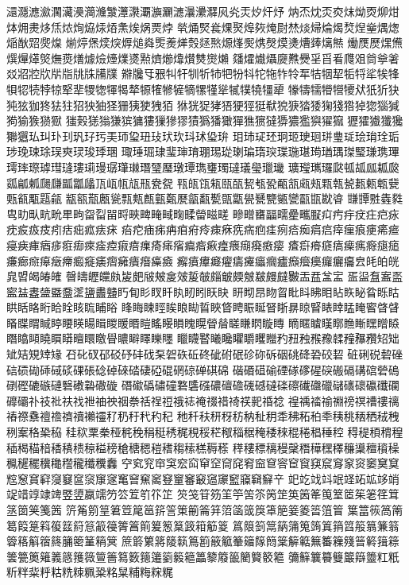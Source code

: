 㶎㶏㶐㶑㶒㶓㶔㶕㶖㶗㶘㶙㶚㶛㶜㶝㶞㶟㶠㶡㶢㶣㶤㶥㶦
㶧㶨㶩㶪㶫㶬㶭㶮㶯㶰㶱㶲㶳㶴㶵㶶㶷㶸㶹㶺㶻㶼㶽㶾㶿
㷀㷁㷂㷃㷄㷅㷆㷇㷈㷉㷊㷋㷌㷍㷎㷏㷐㷑㷒㷓㷔㷕㷖㷗㷘
㷙㷚㷛㷜㷝㷞㷟㷠㷡㷢㷣㷤㷥㷦㷧㷨㷩㷪㷫㷬㷭㷮㷯㷰㷱
㷲㷳㷴㷵㷶㷷㷸㷹㷺㷻㷼㷽㷾㷿㸀㸁㸂㸃㸄㸅㸆㸇㸈㸉㸊
㸋㸌㸍㸎㸏㸐㸑㸒㸓㸔㸕㸖㸗㸘㸙㸚㸛㸜㸝㸞㸟㸠㸡㸢㸣
㸤㸥㸦㸧㸨㸩㸪㸫㸬㸭㸮㸯㸰㸱㸲㸳㸴㸵㸶㸷㸸㸹㸺㸻㸼
㸽㸾㸿㹀㹁㹂㹃㹄㹅㹆㹇㹈㹉㹊㹋㹌㹍㹎㹏㹐㹑㹒㹓㹔㹕
㹖㹗㹘㹙㹚㹛㹜㹝㹞㹟㹠㹡㹢㹣㹤㹥㹦㹧㹨㹩㹪㹫㹬㹭㹮
㹯㹰㹱㹲㹳㹴㹵㹶㹷㹸㹹㹺㹻㹼㹽㹾㹿㺀㺁㺂㺃㺄㺅㺆㺇
㺈㺉㺊㺋㺌㺍㺎㺏㺐㺑㺒㺓㺔㺕㺖㺗㺘㺙㺚㺛㺜㺝㺞㺟㺠
㺡㺢㺣㺤㺥㺦㺧㺨㺩㺪㺫㺬㺭㺮㺯㺰㺱㺲㺳㺴㺵㺶㺷㺸㺹
㺺㺻㺼㺽㺾㺿㻀㻁㻂㻃㻄㻅㻆㻇㻈㻉㻊㻋㻌㻍㻎㻏㻐㻑㻒
㻓㻔㻕㻖㻗㻘㻙㻚㻛㻜㻝㻞㻟㻠㻡㻢㻣㻤㻥㻦㻧㻨㻩㻪㻫
㻬㻭㻮㻯㻰㻱㻲㻳㻴㻵㻶㻷㻸㻹㻺㻻㻼㻽㻾㻿㼀㼁㼂㼃㼄
㼅㼆㼇㼈㼉㼊㼋㼌㼍㼎㼏㼐㼑㼒㼓㼔㼕㼖㼗㼘㼙㼚㼛㼜㼝
㼞㼟㼠㼡㼢㼣㼤㼥㼦㼧㼨㼩㼪㼫㼬㼭㼮㼯㼰㼱㼲㼳㼴㼵㼶
㼷㼸㼹㼺㼻㼼㼽㼾㼿㽀㽁㽂㽃㽄㽅㽆㽇㽈㽉㽊㽋㽌㽍㽎㽏
㽐㽑㽒㽓㽔㽕㽖㽗㽘㽙㽚㽛㽜㽝㽞㽟㽠㽡㽢㽣㽤㽥㽦㽧㽨
㽩㽪㽫㽬㽭㽮㽯㽰㽱㽲㽳㽴㽵㽶㽷㽸㽹㽺㽻㽼㽽㽾㽿㾀㾁
㾂㾃㾄㾅㾆㾇㾈㾉㾊㾋㾌㾍㾎㾏㾐㾑㾒㾓㾔㾕㾖㾗㾘㾙㾚
㾛㾜㾝㾞㾟㾠㾡㾢㾣㾤㾥㾦㾧㾨㾩㾪㾫㾬㾭㾮㾯㾰㾱㾲㾳
㾴㾵㾶㾷㾸㾹㾺㾻㾼㾽㾾㾿㿀㿁㿂㿃㿄㿅㿆㿇㿈㿉㿊㿋㿌
㿍㿎㿏㿐㿑㿒㿓㿔㿕㿖㿗㿘㿙㿚㿛㿜㿝㿞㿟㿠㿡㿢㿣㿤㿥
㿦㿧㿨㿩㿪㿫㿬㿭㿮㿯㿰㿱㿲㿳㿴㿵㿶㿷㿸㿹㿺㿻㿼㿽㿾
㿿䀀䀁䀂䀃䀄䀅䀆䀇䀈䀉䀊䀋䀌䀍䀎䀏䀐䀑䀒䀓䀔䀕䀖䀗
䀘䀙䀚䀛䀜䀝䀞䀟䀠䀡䀢䀣䀤䀥䀦䀧䀨䀩䀪䀫䀬䀭䀮䀯䀰
䀱䀲䀳䀴䀵䀶䀷䀸䀹䀺䀻䀼䀽䀾䀿䁀䁁䁂䁃䁄䁅䁆䁇䁈䁉
䁊䁋䁌䁍䁎䁏䁐䁑䁒䁓䁔䁕䁗䁘䁙䁚䁛䁜䁝䁞䁟䁠䁡䁢䁣
䁤䁥䁦䁧䁨䁩䁪䁫䁬䁭䁮䁯䁰䁱䁲䁳䁴䁵䁶䁷䁸䁹䁺䁻䁼
䁽䁾䁿䂀䂁䂂䂃䂄䂅䂆䂇䂈䂉䂊䂋䂌䂍䂎䂏䂐䂑䂒䂓䂔䂕
䂖䂗䂘䂙䂚䂛䂜䂝䂞䂟䂠䂡䂢䂣䂤䂥䂦䂧䂨䂩䂪䂫䂬䂭䂮
䂯䂰䂱䂲䂳䂴䂵䂶䂷䂸䂹䂺䂻䂼䂽䂾䂿䃀䃁䃂䃃䃄䃅䃆䃇
䃈䃉䃊䃋䃌䃍䃎䃏䃐䃑䃒䃓䃔䃕䃖䃗䃘䃙䃚䃛䃜䃝䃞䃟䃠
䃡䃢䃣䃤䃥䃦䃧䃨䃩䃪䃫䃬䃭䃮䃯䃰䃱䃲䃳䃴䃵䃶䃷䃸䃹
䃺䃻䃼䃽䃾䃿䄀䄁䄂䄃䄄䄅䄆䄇䄈䄉䄊䄋䄌䄍䄎䄏䄐䄑䄒
䄓䄔䄕䄖䄗䄘䄙䄚䄛䄜䄝䄞䄟䄠䄡䄢䄣䄤䄥䄦䄧䄨䄩䄪䄫
䄬䄭䄮䄯䄰䄱䄲䄳䄴䄵䄶䄷䄸䄹䄺䄻䄼䄽䄾䄿䅀䅁䅂䅃䅄
䅅䅆䅇䅈䅉䅊䅋䅌䅍䅎䅏䅐䅑䅒䅓䅔䅕䅖䅗䅘䅙䅚䅛䅜䅝
䅞䅠䅡䅢䅣䅤䅥䅦䅧䅨䅩䅪䅫䅬䅭䅮䅯䅰䅱䅲䅳䅴䅵䅶䅷
䅸䅹䅺䅻䅼䅽䅾䅿䆀䆁䆂䆃䆄䆅䆆䆇䆈䆉䆊䆋䆌䆍䆎䆏䆐
䆑䆒䆓䆔䆕䆖䆗䆘䆙䆚䆛䆜䆝䆞䆟䆠䆡䆢䆣䆤䆥䆦䆧䆨䆩
䆪䆫䆬䆭䆮䆯䆰䆱䆲䆳䆴䆵䆶䆷䆸䆹䆺䆻䆼䆽䆾䆿䇀䇁䇂
䇃䇄䇅䇆䇇䇈䇉䇊䇋䇌䇍䇎䇏䇐䇑䇒䇓䇔䇕䇖䇗䇘䇙䇚䇛
䇜䇝䇞䇟䇠䇡䇢䇣䇤䇥䇦䇧䇨䇩䇪䇫䇬䇭䇮䇯䇰䇱䇲䇳䇴
䇵䇶䇷䇸䇹䇺䇻䇼䇽䇾䇿䈀䈁䈂䈃䈄䈅䈆䈇䈈䈉䈊䈋䈌䈍
䈎䈏䈐䈑䈒䈓䈔䈕䈖䈗䈘䈙䈚䈛䈜䈝䈞䈟䈠䈡䈢䈣䈤䈥䈦
䈧䈨䈩䈪䈫䈬䈭䈮䈯䈰䈱䈲䈳䈴䈵䈶䈷䈸䈹䈺䈻䈼䈽䈾䈿
䉀䉁䉂䉃䉄䉅䉆䉇䉈䉉䉊䉋䉌䉍䉎䉏䉐䉑䉒䉓䉔䉕䉖䉗䉘
䉙䉚䉛䉜䉝䉞䉟䉠䉡䉢䉣䉤䉥䉦䉧䉨䉩䉪䉫䉬䉭䉮䉯䉰䉱
䉲䉳䉴䉵䉶䉷䉸䉹䉺䉻䉼䉽䉾䉿䊀䊁䊂䊃䊄䊅䊆䊇䊈䊉䊊
